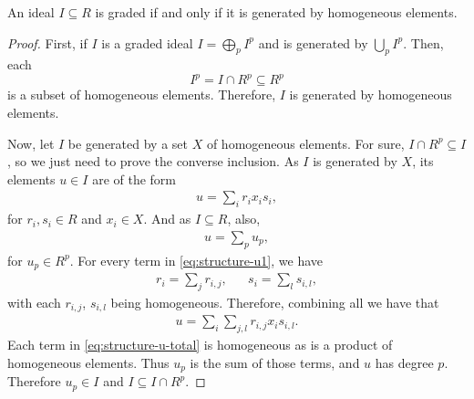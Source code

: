 \begin{proposition} \label{prop:graded-iff-homo}
    An ideal $ I \subseteq R $ is graded if and only if it is generated by homogeneous elements.
\end{proposition}
\begin{proof}
    First, if $ I $ is a graded ideal $ I = \bigoplus_p I^p $ and is generated by $ \bigcup_p I^p $. Then, each
    $$
        I^p = I \cap R^p \subseteq R^p 
    $$
    is a subset of homogeneous elements. Therefore, $ I $ is generated by homogeneous elements.
    
    Now, let $ I $ be generated by a set $ X $ of homogeneous elements. For sure, $ I \cap R^p \subseteq I $, so we just need to prove the converse inclusion. As $ I $ is generated by $ X $, its elements $ u \in I $ are of the form
    \begin{align}
        u = \sum_i r_i x_i s_i, \label{eq:structure-u1}
    \end{align}
    for $ r_i, s_i \in R $ and $ x_i \in X $. And as $ I \subseteq R $, also,
    \begin{align}
        u = \sum_p u_p,
    \end{align}
    for $ u_p \in R^p $. For every term in \eqref{eq:structure-u1}, we have
    \begin{align}
        r_i = \sum_j r_{i,j}, &  & s_i = \sum_l s_{i,l}, 
    \end{align}
    with each $ r_{i,j} $, $ s_{i,l} $ being homogeneous. Therefore, combining all we have that
    \begin{align}
        u = \sum_i \sum_{j, l} r_{i, j} x_i s_{i, l}. \label{eq:structure-u-total}
    \end{align}
    Each term in \eqref{eq:structure-u-total} is homogeneous as is a product of homogeneous elements. Thus $ u_p $ is the sum of those terms, and $ u $ has degree $ p $. Therefore $ u_p \in I $ and $ I \subseteq I \cap R^p $.
\end{proof}

